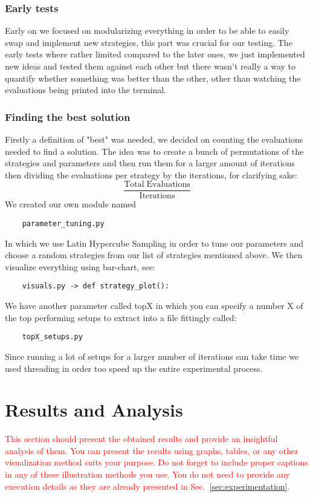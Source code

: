 \documentclass{scrartcl}
\begin{document}
\subsubsection{Early tests}
Early on we focused on modularizing everything in order to be able to easily swap and implement new strategies, this part was crucial for our testing. The early tests where rather limited compared to the later ones, we just implemented new ideas and tested them against each other but there wasn't really a way to quantify whether something was better than the other, other than watching the evaluations being printed into the terminal.
\subsubsection{Finding the best solution}
Firstly a definition of "best" was needed, we decided on counting the evaluations needed to find a solution. The idea was to create a bunch of permutations of the strategies and parameters and then run them for a larger amount of iterations then dividing the evaluations per strategy by the iterations, for clarifying sake:
\begin{equation}
\frac{\text{Total}\; \text{Evaluations}}{\text{Iterations}}
\end{equation}
We created our own module named
\begin{verbatim}
    parameter_tuning.py
\end{verbatim}
In which we use Latin Hypercube Sampling in order to tune our parameters and choose a random strategies from our list of strategies mentioned above. We then visualize everything using bar-chart, see:
\begin{verbatim}
    visuals.py -> def strategy_plot():
\end{verbatim}
We have another parameter called topX in which you can specify a number X of the top performing setups to extract into a file fittingly called:
\begin{verbatim}
    topX_setups.py
\end{verbatim}
Since running a lot of setups for a larger number of iterations can take time we used threading in order too speed up the entire experimental process.

\section{Results and Analysis}
\label{sec:results-analysis}

\textcolor{red}{This section should present the obtained results and provide an insightful analysis of them. You can present the results using graphs, tables, or any other visualization method suits your purpose. Do not forget to include proper captions \cite{zobel2014graphs} in any of these illustration methods you use. You do not need to provide any execution details as they are already presented in Sec.~\ref{sec:experimentation}.}
\end{document}
